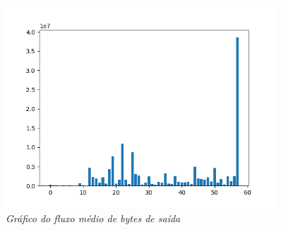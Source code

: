 \begin{figure}[h!]
    \label{high}
    \centering
    \includegraphics[width=0.9\textwidth]{Images/b1/b1_4.png}
    \caption{\textit{Gráfico do fluxo médio de bytes de saída}}
\end{figure}

